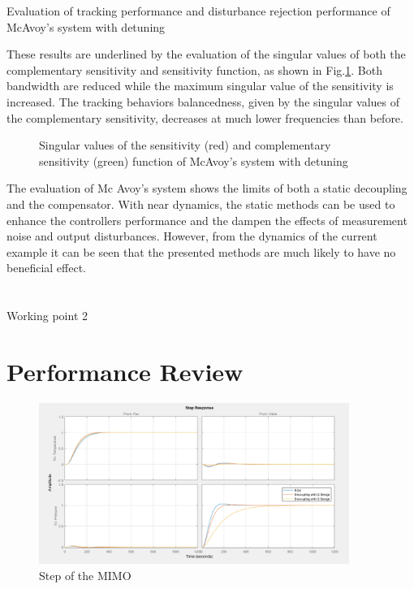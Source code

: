 \begin{table}[H]
\centering
\caption{Evaluation of tracking performance and disturbance rejection performance of McAvoy's system with detuning}
\label{c:fotd:s:mcavoy:tab:eval2}

\end{table}

These results are underlined by the evaluation of the singular values of both the complementary sensitivity and sensitivity function, as shown in Fig.\ref{c:fotd:s:mcavoy:f:SingValDetuned}. Both bandwidth are reduced while the maximum singular value of the sensitivity is increased. The tracking behaviors balancedness, given by the singular values of the complementary sensitivity, decreases at much lower frequencies than before.

\begin{figure}[H]\centering

\caption{Singular values of the sensitivity (red) and complementary sensitivity (green) function of  McAvoy's system with detuning}
\label{c:fotd:s:mcavoy:f:SingValDetuned}
\end{figure}

The evaluation of Mc Avoy's system shows the limits of both a static decoupling and the compensator. With near dynamics, the static methods can be used to enhance the controllers performance and the dampen the effects of measurement noise and output disturbances. However, from the dynamics of the current example it can be seen that the presented methods are much likely to have no beneficial effect.

\section{}%
\label{c:fotd:s:wp1}

Working point 2

\section{Performance Review} %
\label{c:fotd:s:performance_review}

\begin{figure}[H]
\begin{minipage}[b]{\textwidth}
\centering
\includegraphics[width=0.9\textwidth]{./Graphics/Step_MATLAB.png}
\caption{Step of the MIMO}
\label{c:fotd:f:mimo_step}
\end{minipage}
\end{figure}

